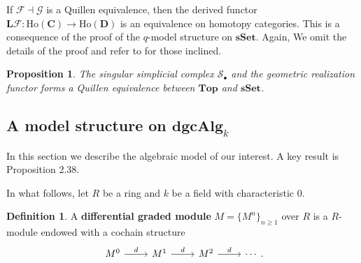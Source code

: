 \documentclass[psamsfonts]{amsart}
\newtheorem{prop}{Proposition}[section]
\theoremstyle{definition}
\newtheorem{defn}{Definition}[section]
\newcommand{\Top}{\mathbf{Top}}
\newcommand{\sSet}{\mathbf{sSet}}
\newcommand{\dgcAlg}{\mathbf{dgcAlg}}
\newcommand{\Ho}{\mathrm{Ho}}
\newcommand{\W}{\mathrm{W}}
\newcommand{\Fib}{\mathrm{Fib}}
\newcommand{\Cof}{\mathrm{Cof}}
\newcommand{\cof}{\mathrm{cof}}
\numberwithin{equation}{section}
\begin{document}
If $\mathcal{F}\dashv\mathcal{G}$ is a Quillen equivalence, then the derived functor $\mathbf{L}\mathcal{F}:\Ho(\mathbf{C})\to\Ho(\mathbf{D})$ is an equivalence on homotopy categories. This is a consequence of the proof of the $q$-model structure on $\sSet$. Again, We omit the details of the proof and refer to \cite{May-Ponto} for those inclined.

\begin{prop}
The singular simplicial complex $\mathcal{S}_\bullet$ and the geometric realization functor forms a Quillen equivalence between $\Top$ and $\sSet$.
\end{prop}
%
%

\bigskip

\subsection{A model structure on $\dgcAlg_k$}\label{Section 2.3}

In this section we describe the algebraic model of our interest. A key result is Proposition 2.38.\medbreak

In what follows, let $R$ be a ring and $k$ be a field with characteristic $0$.

\begin{defn}
A \textbf{differential graded module} $M=\{M^{n}\}_{n\geq1}$ over $R$ is a $R$-module endowed with a cochain structure
\[\begin{tikzcd}
M^0\arrow[r,"d"]&M^1\arrow[r,"d"]&M^2\arrow[r,"d"]&\cdots
\end{tikzcd}.\]
\end{defn}
\end{document}
